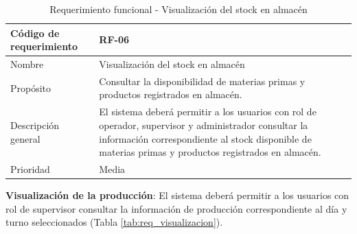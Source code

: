 \begin{table}[H]
    \centering
    \caption{Requerimiento funcional - Visualización del stock en almacén}
    \label{tab:req_stock}
    \begin{tabularx}{\textwidth}{|X|X|}
        \hline
        Código de requerimiento & RF-06                                                                                                                                                                                                         \\ \hline
        Nombre                  & Visualización del stock en almacén                                                                                                                                                                            \\ \hline
        Propósito               & Consultar la disponibilidad de materias primas y productos registrados en almacén.                                                                                                                            \\ \hline
        Descripción general     & El sistema deberá permitir a los usuarios con rol de operador, supervisor y administrador consultar la información correspondiente al stock disponible de materias primas y productos registrados en almacén. \\ \hline
        Prioridad               & Media                                                                                                                                                                                                         \\ \hline
    \end{tabularx}
\end{table}


\textbf{Visualización de la producción}: El sistema deberá permitir a los usuarios con rol de supervisor consultar la información de producción correspondiente al día y turno seleccionados (Tabla \ref{tab:req_visualizacion}).

